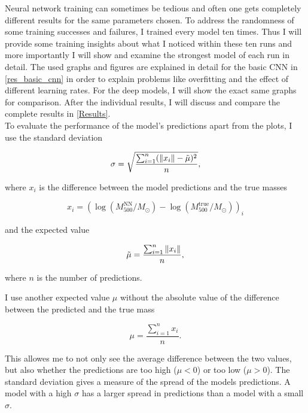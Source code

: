 Neural network training can sometimes be tedious and often one gets completely different results for the same parameters chosen. To address the randomness of some training successes and failures, I trained every model ten times. Thus I will provide some training insights about what I noticed within these ten runs and more importantly I will show and examine the strongest model of each run in detail. The used graphs and figures are explained in detail for the basic CNN in \cref{res_basic_cnn} in order to explain problems like overfitting and the effect of different learning rates. For the deep models, I will show the exact same graphs for comparison. After the individual results, I will discuss and compare the complete results in \cref{Results}.\\
To evaluate the performance of the model's predictions apart from the plots, I use the standard deviation

\begin{equation}
    \sigma = \sqrt{\frac{\sum_{i=1}^{n}(\|x_i\| - \Tilde{\mu})^2}{n}},
\end{equation}

where $x_i$ is the difference between the model predictions and the true masses

\begin{equation}
    x_i =(\log{(M_{500}^{\text{NN}}/M_{\odot})} - \log{(M_{500}^{\text{true}}/M_{\odot})})_i
\end{equation}

and the expected value

\begin{equation}
    \Tilde{\mu} = \frac{\sum_{i=1}^{n}\|x_i\|}{n},
\end{equation}

where $n$ is the number of predictions.

I use another expected value $\mu$ without the absolute value of the difference between the predicted and the true mass

\begin{equation}
    \mu = \frac{\sum_{i=1}^{n} x_i}{n}.
\end{equation}

This allowes me to not only see the average difference between the two values, but also whether the predictions are too high ($\mu < 0$) or too low ($\mu > 0$).
The standard deviation gives a measure of the spread of the models predictions. A model with a high $\sigma$ has a larger spread in predictions than a model with a small $\sigma$.